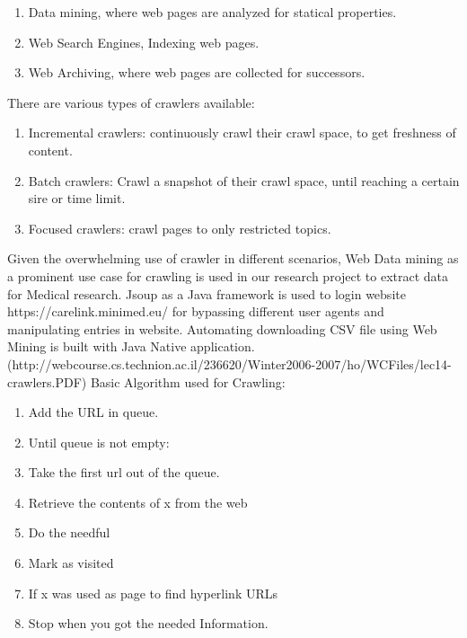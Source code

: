 \documentclass[12pt]{report}
\begin{document}
\begin{enumerate}[label=(\alph*)]
\item	Data mining, where web pages are analyzed for statical properties.
\item	Web Search Engines, Indexing web pages.
\item	Web Archiving, where web pages are collected for successors.
\end{enumerate}
There are various types of crawlers available:
\begin{enumerate} [label=(\alph*)]
\item	Incremental crawlers: continuously crawl their crawl space, to get freshness of content.
\item	Batch crawlers: Crawl a snapshot of their crawl space, until reaching a certain sire or time limit.
\item	Focused crawlers: crawl pages to only restricted topics.
\end{enumerate}
Given the overwhelming use of crawler in different scenarios, Web Data mining as a prominent use case for crawling is used in our research project to extract data for Medical research. Jsoup as a Java framework is used to login website https://carelink.minimed.eu/ for bypassing different user agents and manipulating entries in website. Automating downloading CSV file using Web Mining is built with Java Native application.
 (http://webcourse.cs.technion.ac.il/236620/Winter2006-2007/ho/WCFiles/lec14-crawlers.PDF)
Basic Algorithm used for Crawling: 
\begin{enumerate} [label=(\alph*)]
\item	Add the URL in queue.
\item	Until queue is not empty:
\item  Take the first url out of the queue.
\item Retrieve the contents of x from the web
\item Do the needful
\item Mark as visited
\item If x was used as page to find hyperlink URLs
\item Stop when you got the needed Information.
\end{enumerate}
\end{document}
